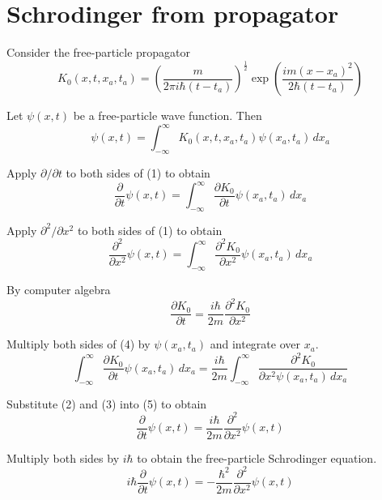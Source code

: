 

\section*{Schrodinger from propagator}

Consider the free-particle propagator
\begin{equation*}
K_0(x,t,x_a,t_a)=\left(\frac{m}{2\pi i\hbar(t-t_a)}\right)^\frac{1}{2}
\exp\left(\frac{im(x-x_a)^2}{2\hbar(t-t_a)}\right)
\end{equation*}

Let $\psi(x,t)$ be a free-particle wave function.
Then
\begin{equation*}
\psi(x,t)=\int_{-\infty}^\infty K_0(x,t,x_a,t_a)\psi(x_a,t_a)\,dx_a
\tag{1}
\end{equation*}

Apply $\partial/\partial t$ to both sides of (1) to obtain
\begin{equation*}
\frac{\partial}{\partial t}\psi(x,t)
=\int_{-\infty}^\infty\frac{\partial K_0}{\partial t}
\psi(x_a,t_a)\,dx_a
\tag{2}
\end{equation*}

Apply $\partial^2/\partial x^2$ to both sides of (1) to obtain
\begin{equation*}
\frac{\partial^2}{\partial x^2}\psi(x,t)
=\int_{-\infty}^\infty\frac{\partial^2 K_0}{\partial x^2}
\psi(x_a,t_a)\,dx_a
\tag{3}
\end{equation*}

By computer algebra
\begin{equation*}
\frac{\partial K_0}{\partial t}
=\frac{i\hbar}{2m}\frac{\partial^2K_0}{\partial x^2}
\tag{4}
\end{equation*}

Multiply both sides of (4) by $\psi(x_a,t_a)$ and integrate over $x_a$.
\begin{equation*}
\int_{-\infty}^\infty\frac{\partial K_0}{\partial t}\psi(x_a,t_a)\,dx_a
=\frac{i\hbar}{2m}
\int_{-\infty}^\infty\frac{\partial^2K_0}{\partial x^2
\psi(x_a,t_a)\,dx_a}
\tag{5}
\end{equation*}

Substitute (2) and (3) into (5) to obtain
\begin{equation*}
\frac{\partial}{\partial t}\psi(x,t)
=\frac{i\hbar}{2m}\frac{\partial^2}{\partial x^2}\psi(x,t)
\end{equation*}

Multiply both sides by $i\hbar$ to obtain the free-particle Schrodinger equation.
\begin{equation*}
i\hbar\frac{\partial}{\partial t}\psi(x,t)
=-\frac{\hbar^2}{2m}\frac{\partial^2}{\partial x^2}\psi(x,t)
\end{equation*}



